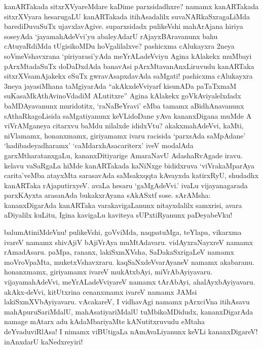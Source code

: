 \documentclass[11pt,a4size]{article}
\begin{document}
kanARTakada sitxrXVyareMdare kaDime parxsidadhxre? namamx kanARTakada
sitxrXVyara hesarugaLU kanARTakada itihAsadalilx suvaNARkaSxragaLiMda
barediDuvaSuTx ujavxlavAgive. suparxsidadx pulikeVshi mahArAjana
hiriya soseyAda `jayamahAdeVvi'yu abaleyAdarU rAjayxBAravanunx bahu
cAtuyaRdiMda tUgisikoMDu hoVgalilalxve? pashicxma cAlukayxra 2neya
soVmeVshavxrana `piriyarasi'yAda meYrALadeVviyu Agina kAlakekx muMbayi
pArxMtadaSuTx doDaDxdAda banavAsi pArxMtavanAnxLiruvudu kanARTaka
sitxrXVsamAjakekx eSuTx gwravAsapxdavAda saMgati! pashicxma cAlukayxra
3neya jayasiMhana taMgiyarAda ``akAkxdeVviyarf kisunADa paTaTxmaM
suKasaMkAthAvinoVdadiM ALutitxre'' Agina kAlakekx goVkAviyalelxdadx
baMDAyavanunx muridotitx, `raNaBeYravi' eMba tamamx aBidhAnavanunx
sAthaRkagoLisida saMgatiyanunx keVLidoDane yAva kananxDigana muMde A
viVrAMganeya citarxvu baMdu nilalxde ididxVtu? akakxmahAdeVvi, kaMti,
niVlamamx, honanxmamx, giriyamamx ivaru racisida `parxsAda saMpAdane'
`hadibadeyadharamx' `caMdarxhAsacariterx' iveV modalAda
garxMtharatanxgaLu, kananxDitiyarige AmaraNavU AdashaRvAgade
iravu. kelavu vaSaRgaLa hiMde kanARTakada kaNiNxge bididxruva
`viVrakaMparAya carita'veMba atayxMta sarasavAda saMsakxqqta kAvayxda
katirxRyU, shudadhx kanARTaka rAjaputirxyeV. avaLa hesaru
`gaMgAdeVvi.' ivaLu vijayanagarada parxKAyxta arasanAda bukakxrAyana
sAkASxtf sose. sArAMsha: kananxDigarAda kanARTaka varakavigaLanunx
nitayxdalilx samxrisi, avara aDiyalilx kuLitu, Igina kavigaLu kaviteya
sUPxtiRyanunx paDeyabeVku!

balumAtiniMdeVnu! pulikeVshi, goVviMda, naqpatuMga, teYlapa, vikarxma
ivareV namamx shivAjiV bAjiVrAya muMtAdavaru. vidAyxraNayxreV
 namamx
rAmadAsaru. paMpa, rananx, lakiSxmXVsha, SaDakaSxrigaLeV namamx
moVroVpaMta, muketxVshavxraru. kaqSaNxdeVvarAyaneV namamx akabaranu.
honanxmamx, giriyamamx ivareV mukAtxbAyi, miVrAbAyiyavaru.
vijayamahAdeVvi, meYrALadeVviyareV  namamx tArAbAyi,
ahalAyxbAyiyavaru. akAkx-deVvi, kitUtxrina cenanxmamx ivareV namamx
JAMsi lakiSxmXVbAyiyavaru. vAcakareV, I vidhavAgi namamx pArxciVna
itihAsavu mahApuruSariMdalU, mahAsatiyariMdalU tuMbikoMDidudx,
kananxDigarAda namage mAtarx adu kAdaMbariyaMte kANutitxruvudu eMtaha
deYvaduviRlAsa! I nimamx viBUtigaLa nAmAvaLiyanunx keVLi
kananxDigareV! inAnxdarU kaNedxreyiri!
\end{document}
